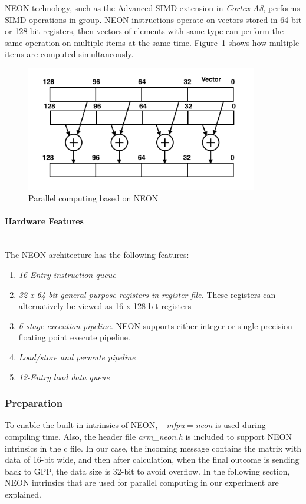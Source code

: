 NEON technology, such as the Advanced SIMD extension in \emph{Cortex-A8}, performs SIMD operations in group. 
NEON instructions operate on vectors stored in 64-bit or 128-bit registers, 
then vectors of elements with same type can perform the same operation on multiple items at the same time.
Figure~\ref{fig:neon} shows how multiple items are computed simultaneously. 

\begin{figure}[h]
\centering
\includegraphics[width=0.9\textwidth]{images/neon}
\caption{Parallel computing based on NEON}
\label{fig:neon}
\end{figure}

\paragraph{Hardware Features}
~\\
The NEON architecture has the following features\cite{hardware}:
\begin{enumerate}
\item \emph{16-Entry instruction queue}
\item \emph{32 x 64-bit general purpose registers in register file.}
These registers can alternatively be viewed as 16 x 128-bit registers
\item \emph{6-stage execution pipeline.}
NEON supports either integer or single precision floating point execute pipeline.
\item \emph{Load/store and permute pipeline}
\item \emph{12-Entry load data queue}
\end{enumerate}

\subsubsection{Preparation}
To enable the built-in intrinsics of NEON, 
\emph{$-$mfpu$=$neon}\cite{ARMoptions} is used during compiling time.
Also, the header file \emph{arm\_neon.h} is included 
to support NEON intrinsics in the c file.
In our case, the incoming message contains the matrix with data of 16-bit wide, 
and then after calculation, when the final outcome is sending back to GPP, the data size is 32-bit to avoid overflow.
In the following section, NEON intrinsics that are used for parallel computing in our experiment are explained.

